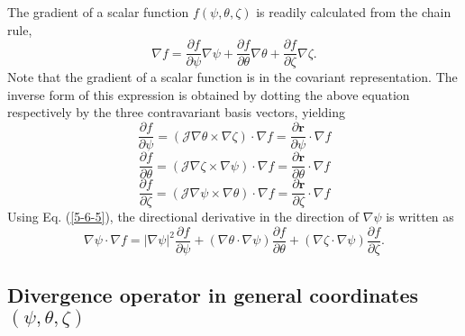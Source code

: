 \documentclass{article}
\begin{document}
The gradient of a scalar function $f (\psi, \theta, \zeta)$ is readily
calculated from the chain rule,
\begin{equation}
  \label{5-6-5} \nabla f = \frac{\partial f}{\partial \psi} \nabla \psi +
  \frac{\partial f}{\partial \theta} \nabla \theta + \frac{\partial
  f}{\partial \zeta} \nabla \zeta .
\end{equation}
Note that the gradient of a scalar function is in the covariant
representation. The inverse form of this expression is obtained by dotting the
above equation respectively by the three contravariant basis vectors, yielding
\begin{equation}
  \label{4-6-1} \frac{\partial f}{\partial \psi} = (\mathcal{J} \nabla \theta
  \times \nabla \zeta) \cdot \nabla f = \frac{\partial \mathbf{r}}{\partial
  \psi} \cdot \nabla f
\end{equation}
\begin{equation}
  \label{4-6-2} \frac{\partial f}{\partial \theta} = (\mathcal{J} \nabla \zeta
  \times \nabla \psi) \cdot \nabla f = \frac{\partial \mathbf{r}}{\partial
  \theta} \cdot \nabla f
\end{equation}
\begin{equation}
  \label{4-6-3} \frac{\partial f}{\partial \zeta} = (\mathcal{J} \nabla \psi
  \times \nabla \theta) \cdot \nabla f = \frac{\partial \mathbf{r}}{\partial
  \zeta} \cdot \nabla f
\end{equation}
Using Eq. (\ref{5-6-5}), the directional derivative in the direction of
$\nabla \psi$ is written as
\begin{equation}
  \nabla \psi \cdot \nabla f = | \nabla \psi |^2 \frac{\partial f}{\partial
  \psi} + (\nabla \theta \cdot \nabla \psi) \frac{\partial f}{\partial \theta}
  + (\nabla \zeta \cdot \nabla \psi) \frac{\partial f}{\partial \zeta} .
\end{equation}

\subsection{Divergence operator in general coordinates $(\psi, \theta,
\zeta)$}
\end{document}
